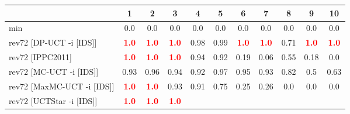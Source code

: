 \documentclass{article}
\begin{document}
\begin{tabular}{|l|r@{$\pm$}rr@{$\pm$}rr@{$\pm$}rr@{$\pm$}rr@{$\pm$}rr@{$\pm$}rr@{$\pm$}rr@{$\pm$}rr@{$\pm$}rr@{$\pm$}r|}
\hline

& \multicolumn{2}{c}{1}
& \multicolumn{2}{c}{2}
& \multicolumn{2}{c}{3}
& \multicolumn{2}{c}{4}
& \multicolumn{2}{c}{5}
& \multicolumn{2}{c}{6}
& \multicolumn{2}{c}{7}
& \multicolumn{2}{c}{8}
& \multicolumn{2}{c}{9}
& \multicolumn{2}{c|}{10}
\\
\hline
\hline
min
& \multicolumn{2}{c}{0.0}
& \multicolumn{2}{c}{0.0}
& \multicolumn{2}{c}{0.0}
& \multicolumn{2}{c}{0.0}
& \multicolumn{2}{c}{0.0}
& \multicolumn{2}{c}{0.0}
& \multicolumn{2}{c}{0.0}
& \multicolumn{2}{c}{0.0}
& \multicolumn{2}{c}{0.0}
& \multicolumn{2}{c|}{0.0}
\\
rev72 [DP-UCT -i [IDS]]
& \multicolumn{2}{c}{\textbf{\textcolor{red}{1.0}}}
& \multicolumn{2}{c}{\textbf{\textcolor{red}{1.0}}}
& \multicolumn{2}{c}{\textbf{\textcolor{red}{1.0}}}
& \multicolumn{2}{c}{0.98}
& \multicolumn{2}{c}{0.99}
& \multicolumn{2}{c}{\textbf{\textcolor{red}{1.0}}}
& \multicolumn{2}{c}{\textbf{\textcolor{red}{1.0}}}
& \multicolumn{2}{c}{0.71}
& \multicolumn{2}{c}{\textbf{\textcolor{red}{1.0}}}
& \multicolumn{2}{c|}{\textbf{\textcolor{red}{1.0}}}
\\
rev72 [IPPC2011]
& \multicolumn{2}{c}{\textbf{\textcolor{red}{1.0}}}
& \multicolumn{2}{c}{\textbf{\textcolor{red}{1.0}}}
& \multicolumn{2}{c}{\textbf{\textcolor{red}{1.0}}}
& \multicolumn{2}{c}{0.94}
& \multicolumn{2}{c}{0.92}
& \multicolumn{2}{c}{0.19}
& \multicolumn{2}{c}{0.06}
& \multicolumn{2}{c}{0.55}
& \multicolumn{2}{c}{0.18}
& \multicolumn{2}{c|}{0.0}
\\
rev72 [MC-UCT -i [IDS]]
& \multicolumn{2}{c}{0.93}
& \multicolumn{2}{c}{0.96}
& \multicolumn{2}{c}{0.94}
& \multicolumn{2}{c}{0.92}
& \multicolumn{2}{c}{0.97}
& \multicolumn{2}{c}{0.95}
& \multicolumn{2}{c}{0.93}
& \multicolumn{2}{c}{0.82}
& \multicolumn{2}{c}{0.5}
& \multicolumn{2}{c|}{0.63}
\\
rev72 [MaxMC-UCT -i [IDS]]
& \multicolumn{2}{c}{\textbf{\textcolor{red}{1.0}}}
& \multicolumn{2}{c}{\textbf{\textcolor{red}{1.0}}}
& \multicolumn{2}{c}{0.93}
& \multicolumn{2}{c}{0.91}
& \multicolumn{2}{c}{0.75}
& \multicolumn{2}{c}{0.25}
& \multicolumn{2}{c}{0.26}
& \multicolumn{2}{c}{0.0}
& \multicolumn{2}{c}{0.0}
& \multicolumn{2}{c|}{0.0}
\\
rev72 [UCTStar -i [IDS]]
& \multicolumn{2}{c}{\textbf{\textcolor{red}{1.0}}}
& \multicolumn{2}{c}{\textbf{\textcolor{red}{1.0}}}
& \multicolumn{2}{c}{\textbf{\textcolor{red}{1.0}}}

\end{tabular}
\end{document}

